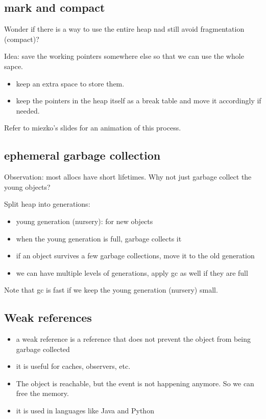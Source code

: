 \documentclass[letterpaper,12pt]{article}
\begin{document}
\subsection{mark and compact}
Wonder if there is a way to use the entire heap nad still avoid fragmentation
(compact)?

Idea: save the working pointers somewhere else so that we can use the whole
sapce. \begin{itemize}
    \item keep an extra space to store them.
    \item keep the pointers in the heap itself as a break table and move it accordingly
          if needed.
\end{itemize}
Refer to miezko's slides for an animation of this process.

\subsection{ephemeral garbage collection}
Observation: most allocs have short lifetimes. Why not just garbage collect the
young objects?

Split heap into generations:\begin{itemize}
    \item young generation (nursery): for new objects
    \item when the young generation is full, garbage collects it
    \item if an object survives a few garbage collections, move it to the old generation
    \item we can have multiple levels of generations, apply gc as well if they are full
\end{itemize}
Note that gc is fast if we keep the young generation (nursery) small.
\subsection{Weak references}
\begin{itemize}
    \item a weak reference is a reference that does not prevent the object from being
          garbage collected
    \item it is useful for caches, observers, etc.
    \item The object is reachable, but the event is not happening anymore. So we can free
          the memory.
    \item it is used in languages like Java and Python
\end{itemize}
\end{document}
